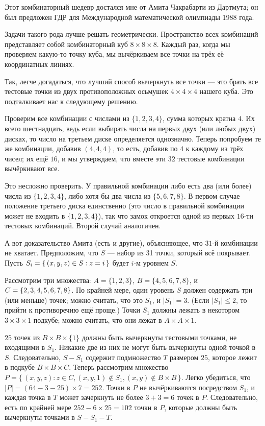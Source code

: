 Этот комбинаторный шедевр достался мне от Амита Чакрабарти из Дартмута;
он был предложен ГДР для Международной математической олимпиады 1988 года.

Задачи такого рода лучше решать геометрически.
Пространство всех комбинаций представляет собой комбинаторный куб $8 \times 8 \times 8$.
Каждый раз, когда мы проверяем какую-то точку куба, мы вычёркиваем все точки на трёх её координатных линиях.

Так, легче догадаться, что лучший способ вычеркнуть все точки --- это брать все тестовые точки из двух противоположных осьмушек $4 \times 4 \times 4$ нашего куба.
Это подталкивает нас к следующему решению.

Проверим все комбинации с числами из $\{1, 2, 3, 4\}$, сумма которых кратна $4$.
Их всего шестнадцать, ведь если выбирать числа на первых двух (или любых двух) дисках, то число на третьем диске определяется однозначно.
Теперь попробуем те же комбинации, добавив $(4,4,4)$, то есть, добавив по $4$ к каждому из трёх чисел;
их ещё $16$, и мы утверждаем, что вместе эти $32$ тестовые комбинации вычёркивают все.

Это несложно проверить.
У правильной комбинации либо есть два (или более) числа из $\{1, 2, 3, 4\}$, либо хотя бы два числа из  $\{5, 6, 7, 8\}$.
В первом случае положение третьего диска единственно (это число в правильной комбинации может не входить в $\{1, 2, 3, 4\}$), так что замок откроется одной из первых $16$-ти тестовых комбинаций.
Второй случай аналогичен.

А вот доказательство Амита (есть и другие), объясняющее, что $31$-й комбинации не хватает.
Предположим, что $S$ --- набор из 31 точки, который всё покрывает.
Пусть $S_i = \{\,(x, y, z) \z\in S : z = i\,\}$ будет $i$-м уровнем $S$.

Рассмотрим три множества:
$A=\{1, 2, 3\}$,
$B = \{4, 5, 6, 7, 8\}$,
и $C \z= \{2, 3, 4, 5, 6, 7, 8\}$.
По крайней мере, один уровень $S$ должен содержать три (или меньше) точек;
можно считать, что это $S_1$, и $|S_1| = 3$.
(Если $|S_1| \le 2$, то прийти к противоречию ещё проще.)
Точки $S_1$ должны лежать в некотором $3 \times 3 \times 1$ подкубе;
можно считать, что они лежат в $A \times A \times {1}$.

$25$ точек из $B \times B \times \{1\}$ должны быть вычеркнуты тестовыми точками, не входящими в $S_1$.
Никакие две из них не могут быть вычеркнуты одной точкой в $S$.
Следовательно, $S - S_1$ содержит подмножество $T$ размером $25$, которое лежит в подкубе $B \times B \times C$.
Теперь рассмотрим множество $P = \{\,(x, y, z) : z \in C, (x, y, 1) \notin S_1 , (x, y) \notin B \times B\,\}$.
Легко убедиться, что $|P| = (64-3-25) \times 7 = 252$.
Точки в $P$ не вычёркиваются посредством $S_1$, и каждая точка в $T$ может зачеркнуть не более $3 + 3 = 6$ точек в $P$. Следовательно, есть по крайней мере $252 - 6 \times 25 = 102$ точки в $P$, которые должны быть вычеркнуты точками в $S - S_1 - T$.

